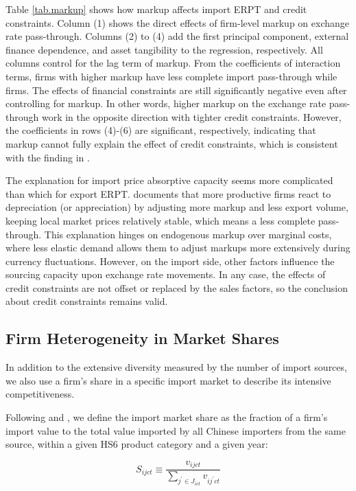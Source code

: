 \documentclass[12pt]{article}
\begin{document}
Table \ref{tab.markup} shows how markup affects import ERPT and credit constraints. Column (1) shows the direct effects of firm-level markup on exchange rate pass-through. Columns (2) to (4) add the first principal component, external finance dependence, and asset tangibility to the regression, respectively. All columns control for the lag term of markup. From the coefficients of interaction terms, firms with higher markup have less complete import pass-through while firms. The effects of financial constraints are still significantly negative even after controlling for markup. In other words, higher markup on the exchange rate pass-through work in the opposite direction with tighter credit constraints. However, the coefficients in rows (4)-(6) are significant, respectively, indicating that markup cannot fully explain the effect of credit constraints, which is consistent with the finding in \cite{xu-guo2021}.

The explanation for import price absorptive capacity seems more complicated than which for export ERPT. \cite{bmm2012} documents that more productive firms react to depreciation (or appreciation) by adjusting more markup and less export volume, keeping local market prices relatively stable, which means a less complete pass-through. This explanation hinges on endogenous markup over marginal costs, where less elastic demand allows them to adjust markups more extensively during currency fluctuations. However, on the import side, other factors influence the sourcing capacity upon exchange rate movements. In any case, the effects of credit constraints are not offset or replaced by the sales factors, so the conclusion about credit constraints remains valid.

\subsection{Firm Heterogeneity in Market Shares}
In addition to the extensive diversity measured by the number of import sources, we also use a firm's share in a specific import market to describe its intensive competitiveness.

Following \cite{aik2014} and \cite{devereux2017}, we define the import market share as the fraction of a firm's import value to the total value imported by all Chinese importers from the same source, within a given HS6 product category and a given year: 

$$
S_{ijct} \equiv \frac{v_{ijct}}{\sum_{j^{\prime} \in J_{ict}} v_{ij^{\prime}ct}}
$$
\end{document}
